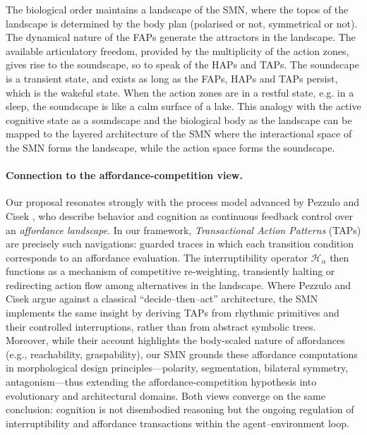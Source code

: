 The biological order maintains a landscape of the SMN, where the topos of the landscape is determined by the body plan (polarised or not, symmetrical or not). The dynamical nature of the FAPs generate the attractors in the landscape. The available articulatory freedom, provided by the multiplicity of the action zones, gives rise to the soundscape, so to speak of the HAPs and TAPs. The soundscape is a transient state, and exists as long as the FAPs, HAPs and TAPs persist, which is the wakeful state. When the action zones are in a restful state, e.g. in a sleep, the soundscape is like a calm surface of a lake. This analogy with the active cognitive state as a soundscape and the biological body as the landscape can be mapped to the layered architecture of the SMN where the interactional space of the SMN forms the landscape, while the action space forms the soundscape.


\paragraph{Connection to the affordance-competition view.}
Our proposal resonates strongly with the process model advanced by Pezzulo and Cisek \citep{PezzuloCisek2016}, who describe behavior and cognition as continuous feedback control over an \emph{affordance landscape}. In our framework, \emph{Transactional Action Patterns} (TAPs) are precisely such navigations: guarded traces in which each transition condition corresponds to an affordance evaluation. The interruptibility operator $\mathcal{H}_{\alpha}$ then functions as a mechanism of competitive re-weighting, transiently halting or redirecting action flow among alternatives in the landscape. Where Pezzulo and Cisek argue against a classical “decide–then–act” architecture, the SMN implements the same insight by deriving TAPs from rhythmic primitives and their controlled interruptions, rather than from abstract symbolic trees. Moreover, while their account highlights the body-scaled nature of affordances (e.g., reachability, graspability), our SMN grounds these affordance computations in morphological design principles—polarity, segmentation, bilateral symmetry, antagonism—thus extending the affordance-competition hypothesis into evolutionary and architectural domains. Both views converge on the same conclusion: cognition is not disembodied reasoning but the ongoing regulation of interruptibility and affordance transactions within the agent–environment loop.

